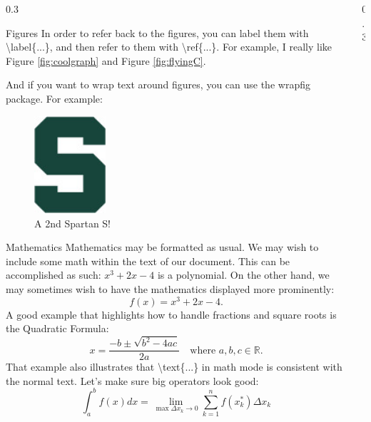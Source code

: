 \documentclass{msuposter}
\newcommand{\colwidth}{0.3\linewidth}
\begin{document}
\begin{frame}{}
\begin{columns}[t]
\begin{column}{\colwidth}
\begin{block}{Figures}
In order to refer back to the figures, you can label them with {\ttfamily\textbackslash label\{...\}}, and then refer to them with {\ttfamily\textbackslash ref\{...\}}.  For example, I really like Figure \ref{fig:coolgraph} and Figure \ref{fig:flyingC}.

And if you want to wrap text around figures, you can use the {\ttfamily wrapfig} package.  For example:

\begin{figure}
  \centering
    \includegraphics[width=0.25\textwidth]{spartans.jpg}
  \caption{A 2nd Spartan S!}
\end{figure}

\lipsum[1-2] %

\end{block}

\begin{block}{Mathematics}
Mathematics may be formatted as usual.  We may wish to include some math within the text of our document.  This can be accomplished as such: $x^{3} + 2x - 4$ is a polynomial.  On the other hand, we may sometimes wish to have the mathematics displayed more prominently:
\[
  f(x) = x^{3} + 2x - 4.
\]
A good example that highlights how to handle fractions and square roots is the Quadratic Formula:
\[
  x = \frac{-b \pm \sqrt{b^{2} - 4ac}}{2a} \quad\text{where } a,b,c \in \mathbb{R}.
\]
That example also illustrates that {\ttfamily \textbackslash text\{...\}} in math mode is consistent with the normal text.  Let's make sure big operators look good:
\[
  \int_{a}^{b} f(x) dx = \lim_{\max \Delta x_{k} \to 0} \sum_{k=1}^{n} f(x_{k}^{*}) \Delta x_{k}
\]
\end{block}

\end{column}


\begin{column}{\colwidth}


\end{column}
\end{columns}
\end{frame}
\end{document}
